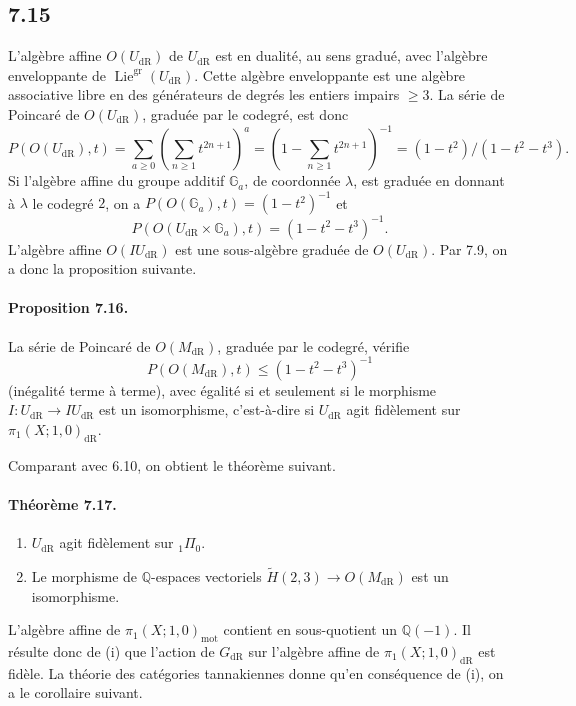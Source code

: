 \documentclass[10pt]{article}
\newcommand{\Q}{\mathbb Q}
\newcommand{\Ga}{\mathbb G_a}
\newcommand{\Lie}{\operatorname{Lie}}
\newcommand{\dR}{\mathrm{dR}}
\newcommand{\mot}{\mathrm{mot}}
\begin{document}
\subsection*{7.15}
L'algèbre affine $O(U_{\dR})$ de $U_{\dR}$ est en dualité, au sens gradué, avec l'algèbre enveloppante de $\Lie^{\mathrm{gr}}(U_{\dR})$. Cette algèbre enveloppante est une algèbre associative libre en des générateurs de degrés les entiers impairs $\geq3$. La série de Poincaré de $O(U_{\dR})$, graduée par le codegré, est donc
\[
P(O(U_{\dR}),t)=\sum_{a\geq0}\left(\sum_{n\geq1}t^{2n+1}\right)^a
=\left(1-\sum_{n\geq1}t^{2n+1}\right)^{-1}
=(1-t^2)/(1-t^2-t^3).
\]
Si l'algèbre affine du groupe additif $\Ga$, de coordonnée $\lambda$, est graduée en donnant à $\lambda$ le codegré $2$, on a $P(O(\Ga),t)=(1-t^2)^{-1}$ et
\[
P(O(U_{\dR}\times\Ga),t)=(1-t^2-t^3)^{-1}.
\]
L'algèbre affine $O(IU_{\dR})$ est une sous-algèbre graduée de $O(U_{\dR})$. Par 7.9, on a donc la proposition suivante.

\paragraph{Proposition 7.16.}
La série de Poincaré de $O(M_{\dR})$, graduée par le codegré, vérifie
\begin{equation}
P(O(M_{\dR}),t)\leq(1-t^2-t^3)^{-1}
\tag{7.16.1}
\end{equation}
(inégalité terme à terme), avec égalité si et seulement si le morphisme $I:U_{\dR}\to IU_{\dR}$ est un isomorphisme, c'est-à-dire si $U_{\dR}$ agit fidèlement sur $\pi_1(X;1,0)_{\dR}$.

Comparant avec 6.10, on obtient le théorème suivant.

\paragraph{Théorème 7.17.}
\begin{enumerate}[label=(\roman*)]
\item $U_{\dR}$ agit fidèlement sur ${}_1\Pi_0$.
\item Le morphisme de $\Q$-espaces vectoriels $\widetilde H(2,3)\to O(M_{\dR})$ est un isomorphisme.
\end{enumerate}
L'algèbre affine de $\pi_1(X;1,0)_{\mot}$ contient en sous-quotient un $\Q(-1)$. Il résulte donc de (i) que l'action de $G_{\dR}$ sur l'algèbre affine de $\pi_1(X;1,0)_{\dR}$ est fidèle. La théorie des catégories tannakiennes donne qu'en conséquence de (i), on a le corollaire suivant.
\end{document}
